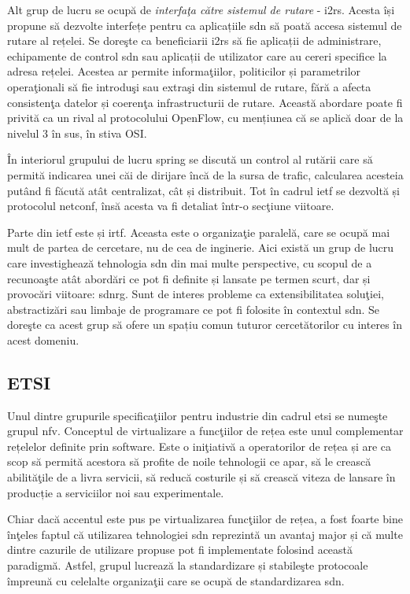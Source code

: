 Alt grup de lucru se ocupă de \textit{interfaţa către sistemul de rutare} - \gls{i2rs}. Acesta își propune să dezvolte interfețe pentru ca aplicațiile \gls{sdn} să poată accesa sistemul de rutare al rețelei. Se doreşte ca beneficiarii \gls{i2rs} să fie aplicații de administrare, echipamente de control \gls{sdn} sau aplicații de utilizator care au cereri specifice la adresa rețelei. Acestea ar permite informaţiilor, politicilor și parametrilor operaţionali să fie introduşi sau extraşi din sistemul de rutare, fără a afecta consistenţa datelor și coerenţa infrastructurii de rutare. Această abordare poate fi privită ca un rival al protocolului OpenFlow, cu mențiunea că se aplică doar de la nivelul 3 în sus, în stiva OSI.

În interiorul grupului de lucru \gls{spring} se discută un control al rutării care să permită indicarea unei căi de dirijare încă de la sursa de trafic, calcularea acesteia putând fi făcută atât centralizat, cât și distribuit. Tot în cadrul \gls{ietf} se dezvoltă și protocolul \gls{netconf}, însă acesta va fi detaliat într-o secţiune viitoare.

Parte din \gls{ietf} este și \gls{irtf}. Aceasta este o organizaţie paralelă, care se ocupă mai mult de partea de cercetare, nu de cea de inginerie. Aici există un grup de lucru care investighează tehnologia \gls{sdn} din mai multe perspective, cu scopul de a recunoaşte atât abordări ce pot fi definite și lansate pe termen scurt, dar și provocări viitoare: \gls{sdnrg}. Sunt de interes probleme ca extensibilitatea soluţiei, abstractizări sau limbaje de programare ce pot fi folosite în contextul \gls{sdn}. Se doreşte ca acest grup să ofere un spațiu comun tuturor cercetătorilor cu interes în acest domeniu.

\subsection{ETSI}

Unul dintre grupurile specificaţiilor pentru industrie din cadrul \gls{etsi} se numeşte grupul \gls{nfv}. Conceptul de virtualizare a funcţiilor de rețea este unul complementar rețelelor definite prin software. Este o iniţiativă a operatorilor de rețea și are ca scop să permită acestora să profite de noile tehnologii ce apar, să le crească abilităţile de a livra servicii, să reducă costurile și să crească viteza de lansare în producție a serviciilor noi sau experimentale.

Chiar dacă accentul este pus pe virtualizarea funcţiilor de rețea, a fost foarte bine înţeles faptul că utilizarea tehnologiei \gls{sdn} reprezintă un avantaj major și că multe dintre cazurile de utilizare propuse pot fi implementate folosind această paradigmă. Astfel, grupul lucrează la standardizare și stabileşte protocoale împreună cu celelalte organizaţii care se ocupă de standardizarea \gls{sdn}.

